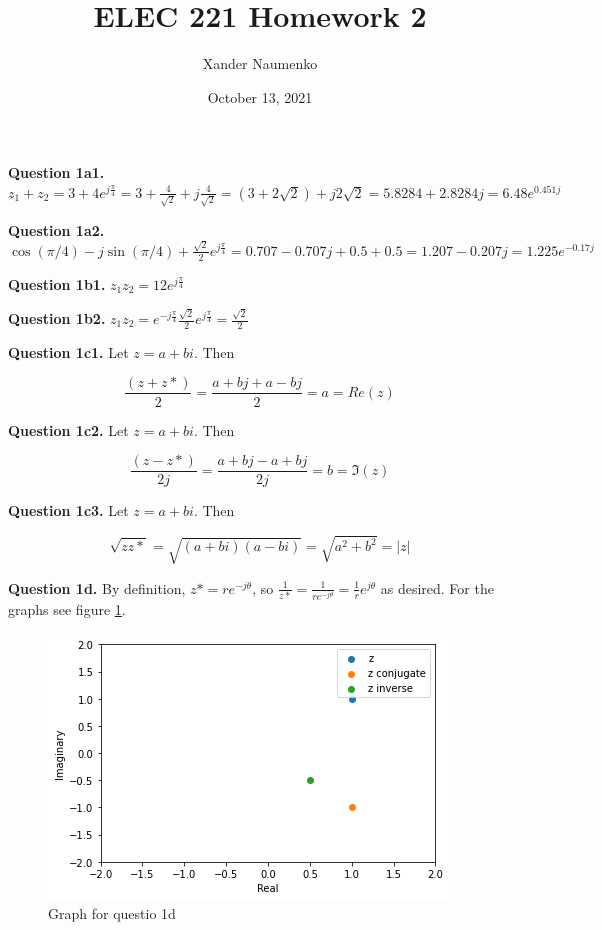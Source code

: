 \documentclass[letterpaper, reqno,11pt]{article}
\begin{document}
\title{ELEC 221 Homework 2}
\date{October 13, 2021}
\author{Xander Naumenko}
\maketitle

{\noindent\bf Question 1a1.} $z_1+z_2=3+4e^{j\frac\pi4}=3+\frac4{\sqrt2}+j\frac4{\sqrt2}=(3+2\sqrt2)+j2\sqrt2=5.8284+2.8284j=6.48e^{0.451j}$

{\noindent\bf Question 1a2.} $\cos(\pi/4)-j\sin(\pi/4)+\frac{\sqrt2}2e^{j\frac\pi4}=0.707-0.707j+0.5+0.5=1.207-0.207j=1.225e^{-0.17j}$

{\noindent\bf Question 1b1.} $z_1z_2=12e^{j\frac\pi4}$

{\noindent\bf Question 1b2.} $z_1z_2=e^{-j\frac\pi4}\frac{\sqrt2}2e^{j\frac\pi4}=\frac{\sqrt2}{2}$

{\noindent\bf Question 1c1.} Let $z=a+bi$. Then 

$$
    \frac{(z+z*)}{2}=\frac{a+bj+a-bj}{2}=a=Re(z)
$$

{\noindent\bf Question 1c2.} Let $z=a+bi$. Then 

$$
    \frac{(z-z*)}{2j}=\frac{a+bj-a+bj}{2j}=b=\Im(z)
$$

{\noindent\bf Question 1c3.} Let $z=a+bi$. Then 

$$
    \sqrt{zz*}=\sqrt{(a+bi)(a-bi)}=\sqrt{a^2+b^2}=|z|
$$

{\noindent\bf Question 1d.} By definition, $z*=re^{-j\theta}$, so $\frac1{z*}=\frac1{re^{-j\theta}}=\frac1re^{j\theta}$ as desired. For the graphs see figure \ref{fig:1d}. 

\begin{figure}[htbp]
\centering
\includegraphics[width=\textwidth]{1d}
\caption{Graph for questio 1d}
\label{fig:1d}
\end{figure}
\end{document}
